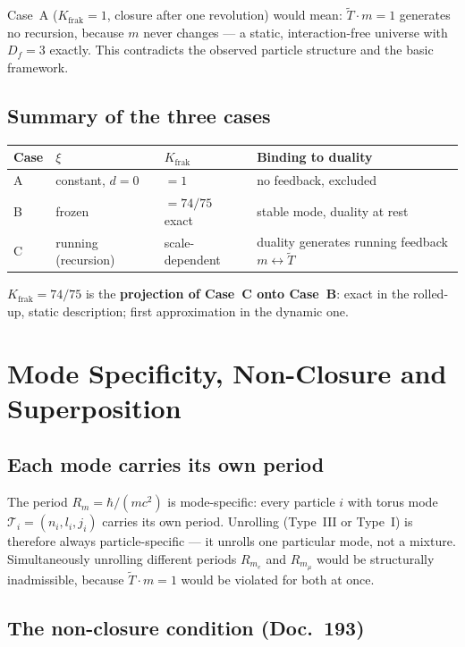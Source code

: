 Case~A ($K_{\text{frak}}=1$, closure after one revolution) would mean:
$\tilde{T}\cdot m=1$ generates no recursion, because $m$ never changes
— a static, interaction-free universe with $D_f=3$ exactly. This
contradicts the observed particle structure and the basic framework.

\subsection{Summary of the three cases}

\begin{center}
\begin{tabular}{p{1.2cm}p{3.5cm}p{3.5cm}p{3.5cm}}
\toprule
\textbf{Case} & \textbf{$\xi$} & \textbf{$K_{\text{frak}}$} &
\textbf{Binding to duality} \\
\midrule
A & constant, $d=0$ & $=1$ & no feedback, excluded \\
B & frozen & $=74/75$ exact & stable mode, duality at rest \\
C & running (recursion) & scale-dependent & duality generates running
  feedback $m\leftrightarrow\tilde{T}$ \\
\bottomrule
\end{tabular}
\end{center}

$K_{\text{frak}}=74/75$ is the \textbf{projection of Case~C onto
Case~B}: exact in the rolled-up, static description; first
approximation in the dynamic one.

\section{Mode Specificity, Non-Closure and Superposition}

\subsection{Each mode carries its own period}

The period $R_m = \hbar/(mc^2)$ is mode-specific: every particle $i$
with torus mode $\mathcal{T}_i=(n_i,l_i,j_i)$ carries its own period.
Unrolling (Type~III or Type~I) is therefore always particle-specific
— it unrolls one particular mode, not a mixture. Simultaneously
unrolling different periods $R_{m_e}$ and $R_{m_\mu}$ would be
structurally inadmissible, because $\tilde{T}\cdot m=1$ would be
violated for both at once.

\subsection{The non-closure condition (Doc.~193)}

